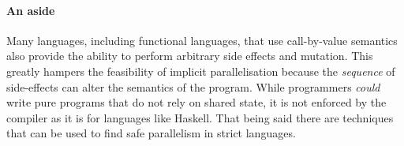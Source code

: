 \paragraph{An aside} Many languages, including functional languages, that use
call-by-value semantics also provide the ability to perform arbitrary side
effects and mutation. This greatly hampers the feasibility of implicit
parallelisation because the \emph{sequence} of side-effects can alter the
semantics of the program. While programmers \emph{could} write pure programs
that do not rely on shared state, it is not enforced by the compiler as it is
for languages like Haskell. That being said there are techniques that can be
used to find safe parallelism in strict languages. 

